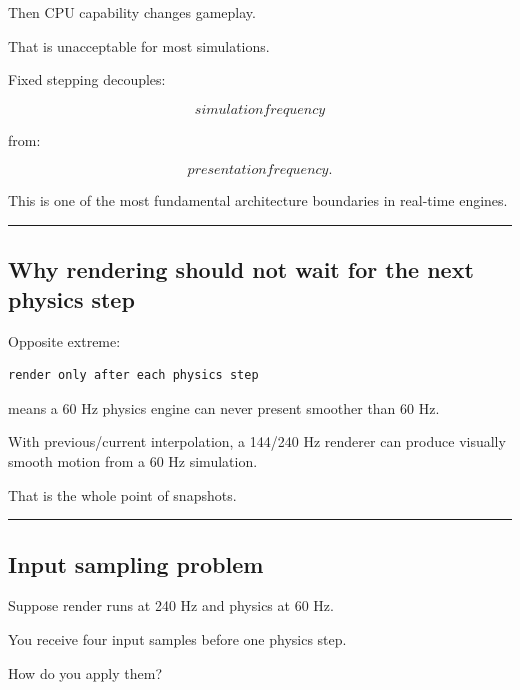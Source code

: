 Then CPU capability changes gameplay.

That is unacceptable for most simulations.

Fixed stepping decouples:

\[
\boxed{
simulation frequency
}
\]

from:

\[
\boxed{
presentation frequency.
}
\]

This is one of the most fundamental architecture boundaries in real-time engines.

\begin{center}\rule{0.5\linewidth}{0.5pt}\end{center}

\subsection{Why rendering should not wait for the next physics step}\label{06-engine-ii-ch038-why-rendering-should-not-wait-for-the-next-physics-step}

\hypertarget{06-engine-ii-ch038-why-rendering-should-not-wait-for-the-next-physics-step}{}

Opposite extreme:

\begin{verbatim}
render only after each physics step
\end{verbatim}

means a 60 Hz physics engine can never present smoother than 60 Hz.

With previous/current interpolation, a 144/240 Hz renderer can produce visually smooth motion from a 60 Hz simulation.

That is the whole point of snapshots.

\begin{center}\rule{0.5\linewidth}{0.5pt}\end{center}

\subsection{Input sampling problem}\label{06-engine-ii-ch038-input-sampling-problem}

\hypertarget{06-engine-ii-ch038-input-sampling-problem}{}

Suppose render runs at 240 Hz and physics at 60 Hz.

You receive four input samples before one physics step.

How do you apply them?

